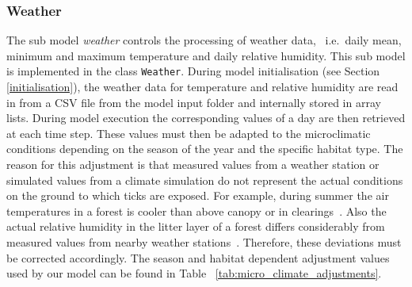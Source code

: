 \documentclass[a4paper, 11pt]{scrartcl}
\newcommand{\inlinecode}[1]{\texttt{\small #1}}
\begin{document}
\subsubsection{Weather}
The sub model \emph{weather} controls the processing of weather data, ~i.e.\ daily mean, minimum and maximum temperature and daily relative humidity. This sub model is implemented in the class \inlinecode{Weather}. During model initialisation (see Section \ref{initialisation}), the weather data for temperature and relative humidity are read in from a CSV file from the model input folder and internally stored in array lists. During model execution the corresponding values of a day are then retrieved at each time step. These values must then be adapted to the microclimatic conditions depending on the season of the year and the specific habitat type. The reason for this adjustment is that measured values from a weather station or simulated values from a climate simulation do not represent the actual conditions on the ground to which ticks are exposed. For example, during summer the air temperatures in a forest is cooler than above canopy or in clearings~\parencite{Bonan.2016, Geiger.1995}. Also the actual relative humidity in the litter layer of a forest differs considerably from measured values from nearby weather stations~\parencite{Boehnke.2017}. Therefore, these deviations must be corrected accordingly. The season and habitat dependent adjustment values used by our model can be found in Table ~\ref{tab:micro_climate_adjustments}.
\end{document}
